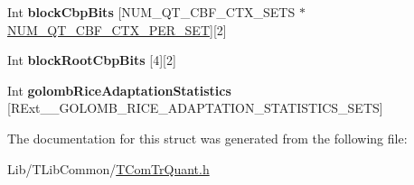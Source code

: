 \begin{DoxyCompactItemize}
\item 
\mbox{\label{structest_bits_sbac_struct_a5d5cb7f246abb10d0c4ed4dd6fc78031}} 
Int {\bfseries block\+Cbp\+Bits} \mbox{[}N\+U\+M\+\_\+\+Q\+T\+\_\+\+C\+B\+F\+\_\+\+C\+T\+X\+\_\+\+S\+E\+TS $\ast$\hyperlink{_context_tables_8h_ae0b676e1722b659e8783940a0545d70a}{N\+U\+M\+\_\+\+Q\+T\+\_\+\+C\+B\+F\+\_\+\+C\+T\+X\+\_\+\+P\+E\+R\+\_\+\+S\+ET}\mbox{]}\mbox{[}2\mbox{]}
\item 
\mbox{\label{structest_bits_sbac_struct_a3a126e7944fd32ca52e03fa39ad3f5cd}} 
Int {\bfseries block\+Root\+Cbp\+Bits} \mbox{[}4\mbox{]}\mbox{[}2\mbox{]}
\item 
\mbox{\label{structest_bits_sbac_struct_a8dcb2f469377c35975b119b13cd2a6aa}} 
Int {\bfseries golomb\+Rice\+Adaptation\+Statistics} \mbox{[}R\+Ext\+\_\+\+\_\+\+G\+O\+L\+O\+M\+B\+\_\+\+R\+I\+C\+E\+\_\+\+A\+D\+A\+P\+T\+A\+T\+I\+O\+N\+\_\+\+S\+T\+A\+T\+I\+S\+T\+I\+C\+S\+\_\+\+S\+E\+TS\mbox{]}
\end{DoxyCompactItemize}


The documentation for this struct was generated from the following file\+:\begin{DoxyCompactItemize}
\item 
Lib/\+T\+Lib\+Common/\hyperlink{_t_com_tr_quant_8h}{T\+Com\+Tr\+Quant.\+h}\end{DoxyCompactItemize}
